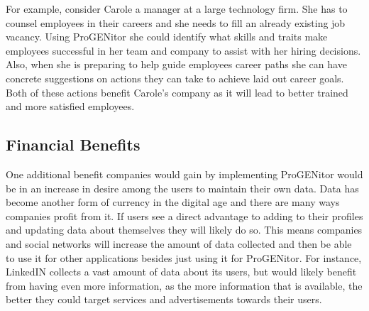 		For example, consider Carole a manager at a large technology firm.  She has
	to counsel employees in their careers and she needs to fill an already
	existing job vacancy.  Using ProGENitor she could identify what skills and
	traits make employees successful in her team and company to assist with her
	hiring decisions.  Also, when she is preparing to help guide employees career
	paths she can have concrete suggestions on actions they can take to achieve
	laid out career goals.  Both of these actions benefit Carole's company as it
	will lead to better trained and more satisfied employees.
\subsection{Financial Benefits}
One additional benefit companies would gain by	implementing ProGENitor would 	
be in an increase in desire among the users to maintain their own data.  Data
has become another form of currency in the digital age and there are many ways
companies profit from it.  If users see a direct advantage to adding to their
profiles and updating data about themselves they will likely do so.  This means
companies and social networks will increase the amount of data collected and
then be able to use it for other applications besides just using it for
ProGENitor.  For instance, LinkedIN collects a vast amount of data about its
users, but would likely benefit from having even more information, as the more
information that is available, the better they could target services and
advertisements towards their users.
